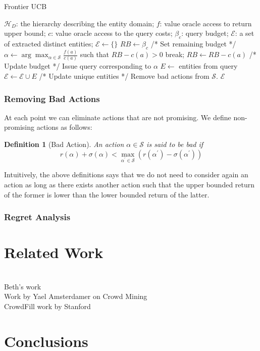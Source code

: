 \documentclass{vldb}
\newtheorem{definition}{Definition}
\newcommand{\hierarchy}{\mathcal{H}_D}
\newcommand{\uentities}{\mathcal{E}}
\begin{document}
\begin{algorithm}[h]
\caption{Frontier UCB}
\label{algo:frontierucb}
\begin{algorithmic}[1]
 $\hierarchy$: the hierarchy describing the entity domain; $f$: value oracle access to return upper bound; $c$: value oracle access to the query costs; $\beta_c$: query budget;
 $\uentities$: a set of extracted distinct entities;
\STATE $\uentities \leftarrow \{\}$
\STATE $RB \leftarrow \beta_c$ /* Set remaining budget */
	\STATE $\alpha \leftarrow \arg\max_{\alpha \in {\mathcal{S}}} \frac{f(a)}{c(a)}$ such that $RB - c(a) >0$
		\STATE break;
	\ENDIF
	\STATE $RB \leftarrow RB - c(a)$ /* Update budget */
	\STATE Issue query corresponding to $\alpha$
	\STATE $E \leftarrow$ entities from query
	\STATE $\uentities \leftarrow \uentities \cup E$ /* Update unique entities */
	\STATE Remove bad actions from $\mathcal{S}$. 
\ENDWHILE
\RETURN $\uentities$
\end{algorithmic}
\end{algorithm}

\subsubsection{Removing Bad Actions} 
At each point we can eliminate actions that are not promising. We define non-promising actions as follows:

\begin{definition}[Bad Action]
An action $\alpha \in \mathcal{S}$ is said to be bad if 
\begin{equation}
r(\alpha) + \sigma(\alpha) < \max_{\alpha^{\prime} \in \mathcal{S}} (r(\alpha^{\prime}) - \sigma(\alpha^{\prime}))
\end{equation}
\end{definition}
Intuitively, the above definitions says that we do not need to consider again an action as long as there exists another action such that the upper bounded return of the former is lower than the lower bounded return of the latter. 
\subsubsection{Regret Analysis}

\section{Related Work}
\label{sec:related}

\ \\Beth's work
\ \\Work by Yael Amsterdamer on Crowd Mining
\ \\CrowdFill work by Stanford

\section{Conclusions}
\label{sec:conclusions}




\end{document}
